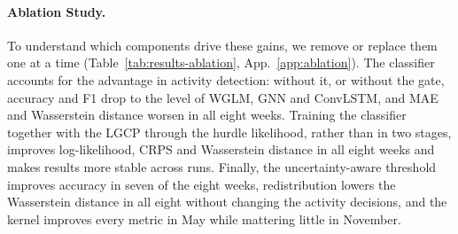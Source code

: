 \paragraph{Ablation Study.} To understand which components drive these gains, we remove or replace them one at a time (Table~\ref{tab:results-ablation}, App.~\ref{app:ablation}). The classifier accounts for the advantage in activity detection: without it, or without the gate, accuracy and F1 drop to the level of WGLM, GNN and ConvLSTM, and MAE and Wasserstein distance worsen in all eight weeks. Training the classifier together with the LGCP through the hurdle likelihood, rather than in two stages, improves log-likelihood, CRPS and Wasserstein distance in all eight weeks and makes results more stable across runs. Finally, the uncertainty-aware threshold improves accuracy in seven of the eight weeks, redistribution lowers the Wasserstein distance in all eight without changing the activity decisions, and the kernel improves every metric in May while mattering little in November.
